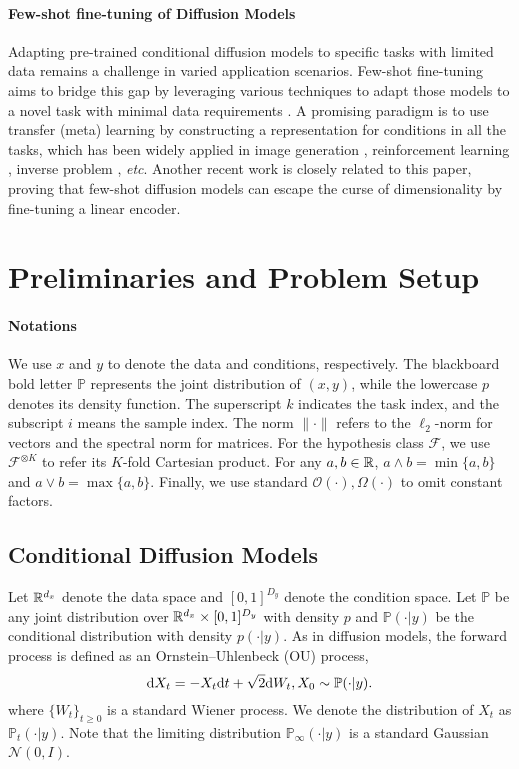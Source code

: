 \documentclass[11pt]{article}
\numberwithin{equation}{section}
\renewcommand{\P}{\mathbb{P}}
\begin{document}
\paragraph{Few-shot fine-tuning of Diffusion Models}

Adapting pre-trained conditional diffusion models to specific tasks with limited data remains a challenge in varied application scenarios.
Few-shot fine-tuning aims to bridge this gap by leveraging various techniques to adapt those models to a novel task with minimal data requirements \citep{ruiz2023dreambooth,giannone2022few}.
A promising paradigm is to use transfer (meta) learning by constructing a representation for conditions in all the tasks, which has been widely applied in image generation \citep{rombach2022high,ramesh2022hierarchical,sinha2021d2c}, reinforcement learning \citep{he2023diffusion,ni2023metadiffuser}, inverse problem \citep{tewari2023diffusion,chung2023solving}, \textit{etc}.
Another recent work \citet{yang2024fewshot} is closely related to this paper, proving that few-shot diffusion models can escape the curse of dimensionality by fine-tuning a linear encoder.  


\section{Preliminaries and Problem Setup}

\paragraph{Notations}
We use $x$ and $y$ to denote the data and conditions, respectively.
The blackboard bold letter $\P$ represents the joint distribution of $(x,y)$, while the lowercase $p$ denotes its density function.
The superscript $k$ indicates the task index, and the subscript $i$ means the sample index.
The norm $\|\cdot\|$ refers to the $\ell_2$-norm  for vectors and the spectral norm for matrices.
For the hypothesis class $\mathcal{F}$, we
use $\mathcal{F}^{\otimes K}$ to refer its $K$-fold Cartesian product.
For any $a,b\in\mathbb{R}$, $a\wedge b=\min\{a,b\}$ and $a\vee b=\max\{a,b\}$.
Finally, we use standard $\mathcal{O}(\cdot), \Omega(\cdot)$ to omit constant
factors.

\subsection{Conditional Diffusion Models}

Let $\mathbb{R}^{d_x}$ denote the data space and $[0,1]^{D_y}$ denote the condition space.
Let $\P$ be any joint distribution over $\mathbb{R}^{d_x}\times[0,1]^{D_y}$ with density $p$ and $\P(\cdot|y)$ be the conditional distribution with density $p(\cdot|y)$.
As in diffusion models, the forward process is defined as an Ornstein–Uhlenbeck (OU) process,
\begin{equation}\label{eq:ou_process}
    \dif X_t = -X_t\dif t + \sqrt{2}\dif W_t, X_0\sim \P(\cdot|y).
\end{equation}
where $\{W_t\}_{t\geq 0}$ is a standard Wiener process. We denote the distribution of $X_t$ as $\P_t(\cdot|y)$.
Note that the limiting distribution $\P_\infty(\cdot|y)$ is a standard Gaussian $\mathcal{N}(0,I)$.
\end{document}
